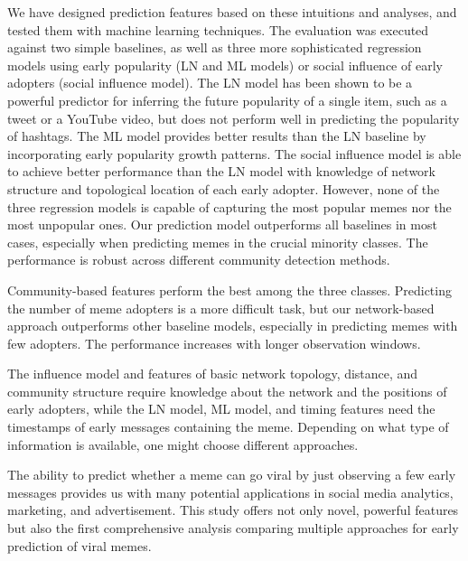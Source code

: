 \documentclass[letterpaper]{article}
\begin{document}
We have designed prediction features based on these intuitions and analyses, and tested them with machine learning techniques. The evaluation was executed against two simple baselines, as well as three more sophisticated regression models using early popularity (LN and ML models) or social influence of early adopters (social influence model).
The LN model has been shown to be a powerful predictor for inferring the future popularity of a single item, such as a tweet or a YouTube video, but does not perform well in predicting the popularity of hashtags. 
The ML model provides better results than the LN baseline by incorporating early popularity growth patterns.
The social influence model is able to achieve better performance than the LN model with knowledge of network structure and topological location of each early adopter.
However, none of the three regression models is capable of capturing the most popular memes nor the most unpopular ones.
Our prediction model outperforms all baselines in most cases, especially when predicting memes in the crucial minority classes. The performance is robust across different community detection methods. 


Community-based features perform the best among the three classes. Predicting the number of meme adopters is a more difficult task, but our network-based approach outperforms other baseline models, especially in predicting memes with few adopters. The performance increases with longer observation windows.


The influence model and features of basic network topology, distance, and community structure require knowledge about the network and the positions of early adopters, while the LN model, ML model, and timing features need the timestamps of early messages containing the meme. 
Depending on what type of information is  available, one might choose different approaches.


The ability to predict whether a meme can go viral by just observing a few early messages provides us with many potential applications in social media analytics, marketing, and advertisement. This study offers not only novel, powerful features but also the first comprehensive analysis comparing multiple approaches for early prediction of viral memes.
\end{document}
